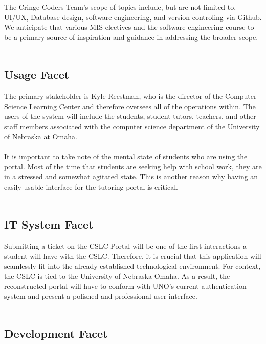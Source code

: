 \documentclass[oneside,openany,obeyspaces]{book}
\newcommand\tab[1][1cm]{\hspace*{#1}}
\newcommand\TeamName{Cringe Coders Team}
\begin{document}
\begin{flushleft}
    \tab The \TeamName's scope of topics include, but are not limited to, UI/UX, Database design, software engineering, and version controling via Github. We anticipate that various MIS electives and the software engineering course to be a primary source of inspiration and guidance in addressing the broader scope.\\~\\

    \subsection{Usage Facet}

    \tab The primary stakeholder is Kyle Reestman, who is the director of the Computer Science Learning Center and therefore oversees all of the operations within. The users of the system will include the students, student-tutors, teachers, and other staff members associated with the computer science department of the University of Nebraska at Omaha.\\~\\

    \tab It is important to take note of the mental state of students who are using the portal. Most of the time that students are seeking help with school work, they are in a stressed and somewhat agitated state. This is another reason why having an easily usable interface for the tutoring portal is critical. \\~\\

    \subsection{IT System Facet}

    \tab Submitting a ticket on the CSLC Portal will be one of the first interactions a student will have with the CSLC. Therefore, it is crucial that this application will seamlessly fit into the already established technological environment. For context, the CSLC is tied to the University of Nebraska-Omaha. As a result, the reconstructed portal will have to conform with UNO’s current authentication system and present a polished and professional user interface.\\~\\

    \subsection{Development Facet}


\end{flushleft}
\end{document}
